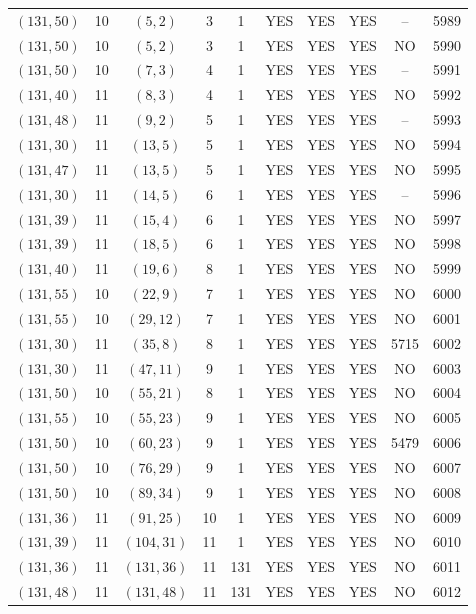 \begin{longtable}{|c|c|c|c|c|c|c|c|c|c|}
$(131, 50)$ & 10 & $(5, 2)$ & 3 & 1 & YES & YES & YES & -- & 5989\\
$(131, 50)$ & 10 & $(5, 2)$ & 3 & 1 & YES & YES & YES & NO & 5990\\
$(131, 50)$ & 10 & $(7, 3)$ & 4 & 1 & YES & YES & YES & -- & 5991\\
$(131, 40)$ & 11 & $(8, 3)$ & 4 & 1 & YES & YES & YES & NO & 5992\\
$(131, 48)$ & 11 & $(9, 2)$ & 5 & 1 & YES & YES & YES & -- & 5993\\
$(131, 30)$ & 11 & $(13, 5)$ & 5 & 1 & YES & YES & YES & NO & 5994\\
$(131, 47)$ & 11 & $(13, 5)$ & 5 & 1 & YES & YES & YES & NO & 5995\\
$(131, 30)$ & 11 & $(14, 5)$ & 6 & 1 & YES & YES & YES & -- & 5996\\
$(131, 39)$ & 11 & $(15, 4)$ & 6 & 1 & YES & YES & YES & NO & 5997\\
$(131, 39)$ & 11 & $(18, 5)$ & 6 & 1 & YES & YES & YES & NO & 5998\\
$(131, 40)$ & 11 & $(19, 6)$ & 8 & 1 & YES & YES & YES & NO & 5999\\
$(131, 55)$ & 10 & $(22, 9)$ & 7 & 1 & YES & YES & YES & NO & 6000\\
$(131, 55)$ & 10 & $(29, 12)$ & 7 & 1 & YES & YES & YES & NO & 6001\\
$(131, 30)$ & 11 & $(35, 8)$ & 8 & 1 & YES & YES & YES & 5715 & 6002\\
$(131, 30)$ & 11 & $(47, 11)$ & 9 & 1 & YES & YES & YES & NO & 6003\\
$(131, 50)$ & 10 & $(55, 21)$ & 8 & 1 & YES & YES & YES & NO & 6004\\
$(131, 55)$ & 10 & $(55, 23)$ & 9 & 1 & YES & YES & YES & NO & 6005\\
$(131, 50)$ & 10 & $(60, 23)$ & 9 & 1 & YES & YES & YES & 5479 & 6006\\
$(131, 50)$ & 10 & $(76, 29)$ & 9 & 1 & YES & YES & YES & NO & 6007\\
$(131, 50)$ & 10 & $(89, 34)$ & 9 & 1 & YES & YES & YES & NO & 6008\\
$(131, 36)$ & 11 & $(91, 25)$ & 10 & 1 & YES & YES & YES & NO & 6009\\
$(131, 39)$ & 11 & $(104, 31)$ & 11 & 1 & YES & YES & YES & NO & 6010\\
$(131, 36)$ & 11 & $(131, 36)$ & 11 & 131 & YES & YES & YES & NO & 6011\\
$(131, 48)$ & 11 & $(131, 48)$ & 11 & 131 & YES & YES & YES & NO & 6012\\

\end{longtable}
